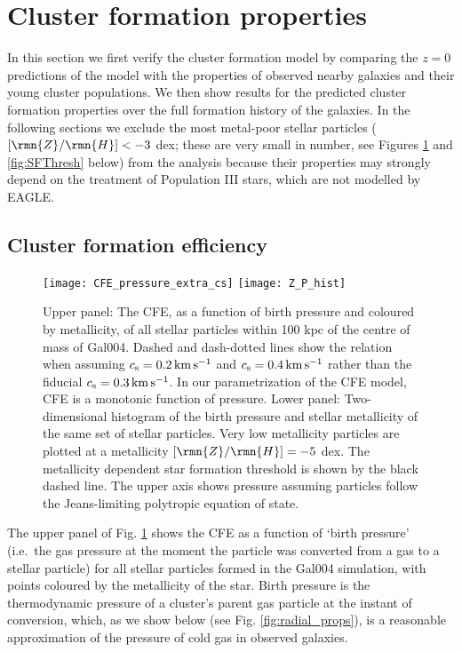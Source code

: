 \documentclass[fleqn,usenatbib]{mnras}
\newcommand\ZH{\lbrack \rmn{Z}/\rmn{H} \rbrack}
\newcommand{\kms}{\,{\rm km}\,{\rm s}^{-1}}
\begin{document}

\section{Cluster formation properties} \label{sec:formation_props}

In this section we first verify the cluster formation model by comparing the $z=0$ predictions of the model with the properties of observed nearby galaxies and their young cluster populations. We then show results for the predicted cluster formation properties over the full formation history of the galaxies.
In the following sections we exclude the most metal-poor stellar particles ($\ZH<-3$ dex; these are very small in number, see Figures \ref{fig:CFE} and \ref{fig:SFThresh} below) from the analysis because their properties may strongly depend on the treatment of Population III stars, which are not modelled by EAGLE.


\subsection{Cluster formation efficiency}

\begin{figure}
    \texttt{[image: CFE\_pressure\_extra\_cs]}
\texttt{[image: Z\_P\_hist]}	
  \caption{Upper panel: The CFE, as a function of birth pressure and coloured by metallicity, of all stellar particles within 100 kpc of the centre of mass of Gal004. Dashed and dash-dotted lines show the relation when assuming $c_{\rm s} = 0.2 \kms$ and $c_{\rm s} = 0.4 \kms$ rather than the fiducial $c_{\rm s} = 0.3 \kms$. In our parametrization of the \citet{Kruijssen_12} CFE model, CFE is a monotonic function of pressure. Lower panel: Two-dimensional histogram of the birth pressure and stellar metallicity of the same set of stellar particles. Very low metallicity particles are plotted at a metallicity $\ZH = -5$ dex. The metallicity dependent star formation threshold is shown by the black dashed line. The upper axis shows pressure assuming particles follow the Jeans-limiting polytropic equation of state.}
  \label{fig:CFE}
\end{figure}

The upper panel of Fig. \ref{fig:CFE} shows the CFE as a function of `birth pressure' (i.e.~the gas pressure at the moment the particle was converted from a gas to a stellar particle) for all stellar particles formed in the Gal004 simulation, with points coloured by the metallicity of the star. Birth pressure is the thermodynamic pressure of a cluster's parent gas particle at the instant of conversion, which, as we show below (see Fig. \ref{fig:radial_props}), is a reasonable approximation of the pressure of cold gas in observed galaxies. 
\end{document}
